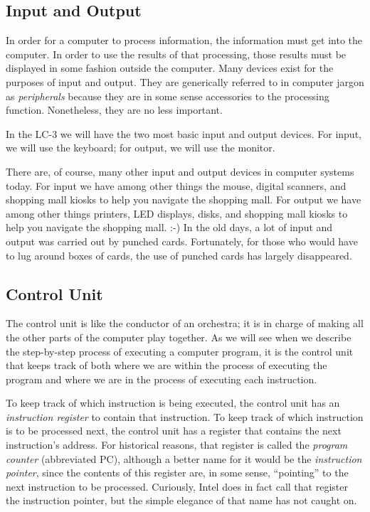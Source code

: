 \documentclass{patt}
\begin{document}
\subsection{Input and Output}
In order for a computer to process information, the information
must get into the computer.  In order to use the results of that processing,
those results
must be displayed in some fashion outside the computer.  Many devices exist
for the purposes of input and output.  They are generically referred to in
computer jargon as {\em peripherals} because they are in some sense accessories
to the processing function.  Nonetheless, they are no less important.

In the LC-3 we will have the two most basic input and output devices.  For
input, we will use the keyboard; for output, we will use the monitor.

There are, of course, many other input and output devices in computer
systems today. For input we have among other things the mouse,
digital scanners, and shopping mall kiosks to help you navigate the shopping
mall.  For output we have among other things printers, LED displays, disks, and
shopping mall kiosks to help you navigate the shopping mall. :-)  In the old 
days, a lot of input and output was carried out by punched cards. Fortunately, 
for those who would have to lug around boxes of cards, the use of punched 
cards has largely disappeared.

\subsection{Control Unit}
The control unit is like the conductor of an orchestra; it is in
charge of making all the other parts of the computer play together.  
As we will see when we describe the step-by-step process of executing a
computer program, it is the control unit that keeps track of both where we
are within the process of executing the program and where we are in the
process of executing each instruction.

To keep track of which instruction is being executed, the control unit has
an {\em instruction register} to contain that instruction.  To keep track of
which instruction is to be processed next, the control unit has a register
that contains the next instruction's address.  For historical reasons, that
register is called the {\em program counter} (abbreviated PC), although a
better name for it would be the {\em instruction pointer}, since the contents
of this register are, in some sense, ``pointing'' to the next instruction to
be processed.  Curiously, Intel does in fact call that register the instruction
pointer, but the simple elegance of that name has not caught on.
\end{document}
